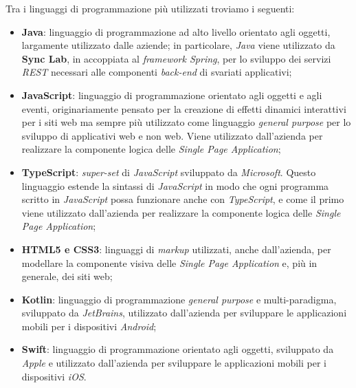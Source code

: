 Tra i linguaggi di programmazione più utilizzati troviamo i seguenti:
\begin{itemize}
  \item \textbf{Java}: linguaggio di programmazione ad alto livello orientato agli oggetti, largamente utilizzato dalle aziende; in particolare, \textit{Java} viene utilizzato da \textbf{Sync Lab}, in accoppiata al \textit{framework Spring}, per lo sviluppo dei servizi \textit{REST} necessari alle componenti \textit{back-end} di svariati applicativi;

  \item \textbf{JavaScript}: linguaggio di programmazione orientato agli oggetti e agli eventi, originariamente pensato per la creazione di effetti dinamici interattivi per i siti web ma sempre più utilizzato come linguaggio \textit{general purpose} per lo sviluppo di applicativi web e non web. Viene utilizzato dall'azienda per realizzare la componente logica delle \textit{Single Page Application};

  \item \textbf{TypeScript}: \textit{super-set} di \textit{JavaScript} sviluppato da \textit{Microsoft}. Questo linguaggio estende la sintassi di \textit{JavaScript} in modo che ogni programma scritto in \textit{JavaScript} possa funzionare anche con \textit{TypeScript}, e come il primo viene utilizzato dall'azienda per realizzare la componente logica delle \textit{Single Page Application};

  \item \textbf{HTML5 e CSS3}: linguaggi di \textit{markup} utilizzati, anche dall'azienda, per modellare la componente visiva delle \textit{Single Page Application} e, più in generale, dei siti web;

  \item \textbf{Kotlin}: linguaggio di programmazione \textit{general purpose} e multi-paradigma, sviluppato da \textit{JetBrains}, utilizzato dall'azienda per sviluppare le applicazioni mobili per i dispositivi \textit{Android};

  \item \textbf{Swift}: linguaggio di programmazione orientato agli oggetti, sviluppato da \textit{Apple} e utilizzato dall'azienda per sviluppare le applicazioni mobili per i dispositivi \textit{iOS}.
\end{itemize}


